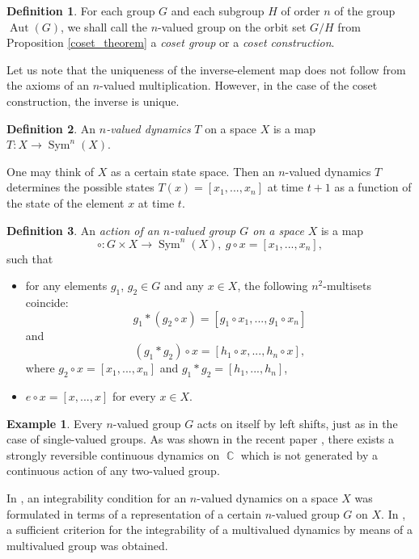 \documentclass[14pt, dvipsnames]{extarticle}
\theoremstyle{plain}
\theoremstyle{definition}
\newtheorem{defi}{Definition}
\newtheorem{example}{\bf Example}
\theoremstyle{remark}
\DeclareMathOperator{\Sym}{\mathrm{Sym}}
\DeclareMathOperator{\Aut}{\mathrm{Aut}}
\DeclareMathOperator{\Cc}{\mathbb{C}}
\begin{document}
\begin{defi}\label{coset_defi}
For each group $G$ and each subgroup $H$ of order $n$ of the group $\Aut(G)$, we shall call the $n$-valued group on the orbit set $G/H$ from Proposition \ref{coset_theorem} a {\it coset group} or a {\it coset construction}.
\end{defi}

Let us note that the uniqueness of the inverse-element map does not follow from the axioms of an $n$-valued multiplication. However, in the case of the coset construction, the inverse is unique.

\begin{defi}
An {\it $n$-valued dynamics} $T$ on a space $X$ is a map $T: X\to \Sym^n(X)$.
\end{defi} 

One may think of $X$ as a certain state space. Then an $n$-valued dynamics $T$ determines the possible states $T(x) = [x_1, ..., x_n]$ at time $t+1$ as a function of the state of the element $x$ at time $t$.

\begin{defi}\label{group_action}
An {\it action of an $n$-valued group $G$ on a space} $X$ is a map
$$\circ: G\times X\to \Sym^n(X),\ g\circ x = [x_1, ..., x_n],$$
such that

\begin{itemize}

 \item for any elements $g_1$, $g_2\in G$ and any $x\in X$, the following $n^2$-multisets coincide:
 $$g_1\ast(g_2\circ x) = [g_1\circ x_1, ..., g_1\circ x_n]$$
 and
 $$(g_1\ast g_2)\circ x = [h_1\circ x, ..., h_n\circ x],$$
 where $g_2\circ x = [x_1, ..., x_n]$ and $g_1\ast g_2 = [h_1, ..., h_n]$,
 
 \item $e\circ x = [x, ..., x]$ for every $x\in X$. 
 
 \end{itemize}
 
\end{defi}


\begin{example}
Every $n$-valued group $G$ acts on itself by left shifts, just as in the case of single-valued groups. As was shown in the recent paper \cite{Posadskiy}, there exists a strongly reversible continuous dynamics on $\Cc$ which is not generated by a continuous action of any two-valued group.
\end{example}

In \cite{Buchstaber_Veselov}, an integrability condition for an $n$-valued dynamics on a space $X$ was formulated in terms of a representation of a certain $n$-valued group $G$ on $X$. In \cite{Yagodovskii}, a sufficient criterion for the integrability of a multivalued dynamics by means of a multivalued group was obtained.
\end{document}
